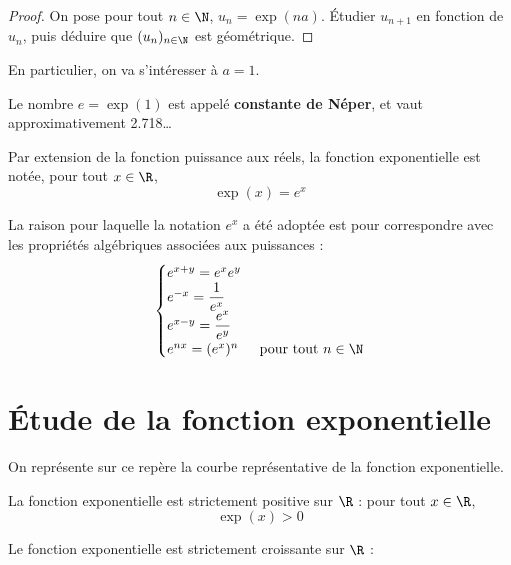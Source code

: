 \documentclass{article}
\begin{document}
\begin{proof}
On pose pour tout $n \in \N$, $u_n = \exp(na)$. Étudier $u_{n+1}$ en fonction de $u_n$, puis déduire que $(u_n)_{n \in \N}$ est géométrique.

\vspace*{0.5cm}
\emptybox{3cm}
\end{proof}
En particulier, on va s'intéresser à $a = 1$.
\begin{definition}
Le nombre $e = \exp(1)$ est appelé \textbf{constante de Néper}, et vaut approximativement \num{2,718}\dots

Par extension de la fonction puissance aux réels, la fonction exponentielle est notée, pour tout $x \in \R$,
\begin{equation*}
\exp(x) = e^x
\end{equation*}
\end{definition}
\begin{remark}
La raison pour laquelle la notation $e^x$ a été adoptée est pour correspondre avec les propriétés algébriques associées aux puissances :
\begin{equation*}
\begin{cases}
e^{x + y} = e^x e^y\\
e^{-x} = \dfrac{1}{e^x}\\
e^{x - y} = \dfrac{e^x}{e^y}\\
e^{nx} = (e^x)^n & \text{ pour tout } n \in \N 
\end{cases}
\end{equation*}
\end{remark}
\newpage
\section{Étude de la fonction exponentielle}
On représente sur ce repère la courbe représentative de la fonction exponentielle.
\begin{center}
\end{center}
\begin{tcolorbox}
\begin{proposition}
La fonction exponentielle est strictement positive sur $\R$ : pour tout $x \in \R$,
\begin{equation*}
\exp(x) > 0
\end{equation*}
\end{proposition}
\end{tcolorbox}
\begin{tcolorbox}
\begin{proposition}
Le fonction exponentielle est strictement croissante sur $\R$ :
\begin{center}
\end{center}
\end{proposition}
\end{tcolorbox}
\end{document}
